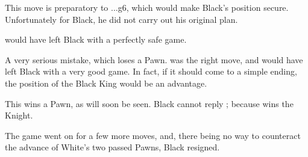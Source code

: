 \documentclass[10pt,twoside]{article}
\begin{document}

This move is preparatory to ...g6, which would make Black's position secure. Unfortunately for Black, he did not carry out his original plan.


 would have left Black with a perfectly safe game.


A very serious mistake, which loses a Pawn.  was the right move, and would have left Black with a very good game. In fact, if it should come to a simple ending, the position of the Black King would be an advantage.


\board


This wins a Pawn, as will soon be seen. Black cannot reply ; because  wins the Knight.


The game went on for a few more moves, and, there being no way to counteract the advance of White's two passed Pawns, Black resigned.
\end{document}
